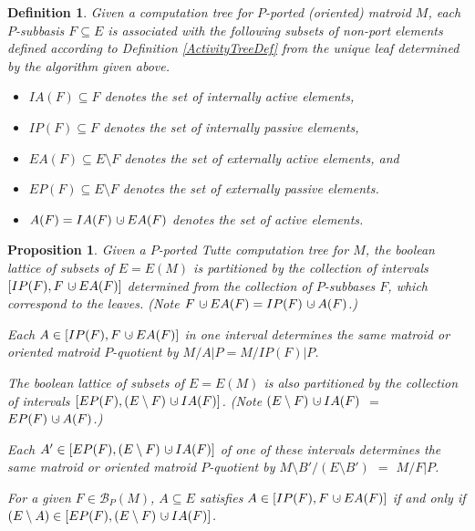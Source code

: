 \documentclass[12pt,leqno]{amsart}
\newtheorem{prop}[lem]{Proposition}
\newtheorem{definition}[lem]{Definition}
\theoremstyle{remark}
\newcommand{\dunion}
{\mbox{\hbox{\hskip6pt$\cdot$\hskip-5.50pt$\cup$\hskip2pt}}}
\begin{document}
\begin{definition}
\label{ActivitySymbolsDef}
Given a computation tree for 
$P$-ported (oriented) matroid $M$,
each $P$-subbasis $F\subseteq E$
is associated with the following subsets of non-port elements
defined according to Definition \ref{ActivityTreeDef}
from the unique leaf determined by the algorithm given above.
\begin{itemize}
\item $IA(F)\subseteq F$ denotes the set of internally active elements,
\item $IP(F)\subseteq F$ denotes the set of internally passive elements,
\item $EA(F)\subseteq E\setminus F$ 
denotes the set of externally active elements,
and 
\item $EP(F)\subseteq E\setminus F$ denotes the set of externally
passive elements.
\item $A(F)=IA(F)\dunion EA(F)$ denotes the set of active elements.
\end{itemize}
\end{definition}

\begin{prop}
\label{PartitionProposition}
Given a $P$-ported Tutte computation tree for
$M$, 
the boolean lattice of subsets of $E=E(M)$
is partitioned by the collection of
intervals $[IP(F),F\dunion EA(F)]$ 
determined from the collection
of $P$-subbases $F$, which correspond to the leaves.
(Note $F\dunion EA(F)=IP(F)\dunion A(F)$.)

Each $A\in [IP(F),F\dunion EA(F)]$ in one interval determines the
same matroid or oriented matroid  $P$-quotient
by $M/A|P=M/IP(F)|P$.

The boolean lattice of subsets of $E=E(M)$
is also partitioned by the collection of
intervals $[EP(F),(E\setminus F)\dunion IA(F)]$.
(Note $(E\setminus F)\dunion IA(F)$ $=$ $EP(F)\dunion A(F)$.)

Each $A'\in [EP(F), (E\setminus F)\dunion IA(F)]$ of one of these
intervals determines the same matroid or oriented matroid
$P$-quotient by $M\setminus B'/(E\setminus B')$
$=$ $M/F|P$.

For a given $F\in\mathcal{B}_P(M)$, $A\subseteq E$ satisfies
$A\in [IP(F),F\dunion EA(F)]$ if and only if 
$(E\setminus A)\in [EP(F),(E\setminus F)\dunion IA(F)]$. 
\end{prop}
\end{document}
